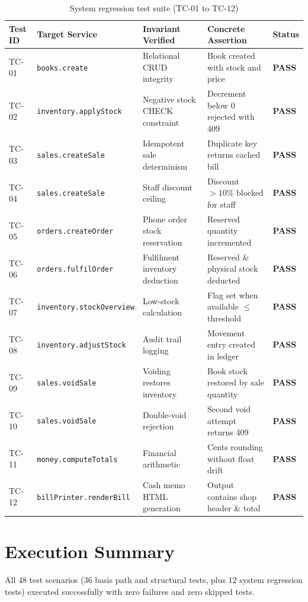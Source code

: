 \documentclass[12pt, a4paper]{report}
\begin{document}
\begin{table}[H]
\centering
\footnotesize
\begin{tabularx}{\textwidth}{L{1.8cm} L{3.2cm} L{5.2cm} L{3.8cm} C{1.2cm}}
\toprule
\textbf{Test ID} & \textbf{Target Service} & \textbf{Invariant Verified} & \textbf{Concrete Assertion} & \textbf{Status} \\
\midrule
TC-01 & \texttt{books.create} & Relational CRUD integrity & Book created with stock and price & \textbf{PASS} \\
TC-02 & \texttt{inventory.applyStock} & Negative stock CHECK constraint & Decrement below 0 rejected with 409 & \textbf{PASS} \\
TC-03 & \texttt{sales.createSale} & Idempotent sale determinism & Duplicate key returns cached bill & \textbf{PASS} \\
TC-04 & \texttt{sales.createSale} & Staff discount ceiling & Discount $>10\%$ blocked for staff & \textbf{PASS} \\
TC-05 & \texttt{orders.createOrder} & Phone order stock reservation & Reserved quantity incremented & \textbf{PASS} \\
TC-06 & \texttt{orders.fulfilOrder} & Fulfilment inventory deduction & Reserved \& physical stock deducted & \textbf{PASS} \\
TC-07 & \texttt{inventory.stockOverview} & Low-stock calculation & Flag set when available $\le$ threshold & \textbf{PASS} \\
TC-08 & \texttt{inventory.adjustStock} & Audit trail logging & Movement entry created in ledger & \textbf{PASS} \\
TC-09 & \texttt{sales.voidSale} & Voiding restores inventory & Book stock restored by sale quantity & \textbf{PASS} \\
TC-10 & \texttt{sales.voidSale} & Double-void rejection & Second void attempt returns 409 & \textbf{PASS} \\
TC-11 & \texttt{money.computeTotals} & Financial arithmetic & Cents rounding without float drift & \textbf{PASS} \\
TC-12 & \texttt{billPrinter.renderBill} & Cash memo HTML generation & Output contains shop header \& total & \textbf{PASS} \\
\bottomrule
\end{tabularx}
\caption{System regression test suite (TC-01 to TC-12)}
\label{tab:regression}
\end{table}

\chapter{Execution Summary}
All 48 test scenarios (36 basis path and structural tests, plus 12 system regression tests) executed successfully with zero failures and zero skipped tests.
\end{document}
